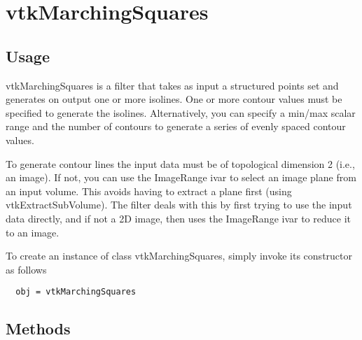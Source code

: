 \section{vtkMarchingSquares}

\subsection{Usage}

 vtkMarchingSquares is a filter that takes as input a structured points set
 and generates on output one or more isolines.  One or more contour values 
 must be specified to generate the isolines.  Alternatively, you can specify 
 a min/max scalar range and the number of contours to generate a series of 
 evenly spaced contour values. 

 To generate contour lines the input data must be of topological dimension 2 
 (i.e., an image). If not, you can use the ImageRange ivar to select an
 image plane from an input volume. This avoids having to extract a plane first
 (using vtkExtractSubVolume).  The filter deals with this by first
 trying to use the input data directly, and if not a 2D image, then uses the 
 ImageRange ivar to reduce it to an image.

To create an instance of class vtkMarchingSquares, simply
invoke its constructor as follows
\begin{verbatim}
  obj = vtkMarchingSquares
\end{verbatim}
\subsection{Methods}

